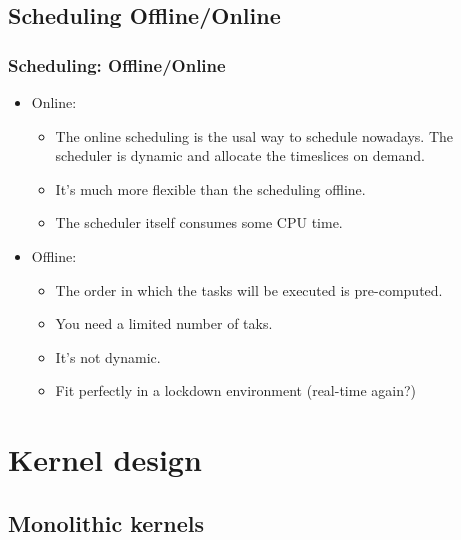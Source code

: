 \subsection{Scheduling Offline/Online}
\begin{frame}
  \frametitle{Scheduling: Offline/Online}
        \begin{itemize}
        \item Online:
        \begin{itemize}
                \item The online scheduling is the usal way to schedule
                nowadays. The scheduler is dynamic and allocate the
                timeslices on demand.
                \item It's much more flexible than the scheduling
                offline.
                \item The scheduler itself consumes some CPU time.
        \end{itemize}
        \item Offline:
        \begin{itemize}
                \item The order in which the tasks will be executed is
                pre-computed.
                \item You need a limited number of taks.
                \item It's not dynamic.
                \item Fit perfectly in a lockdown environment (real-time
                again?)
        \end{itemize}
        \end{itemize}
\end{frame}

%
%

\section{Kernel design}
\subsection{Monolithic kernels}

%
%

